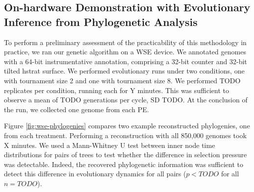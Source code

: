 
\subsection{On-hardware Demonstration with Evolutionary Inference from Phylogenetic Analysis}



To perform a preliminary assessment of the practicability of this methodology in practice, we ran our genetic algorithm on a WSE device.
We annotated genomes with a 64-bit instrumentative annotation, comprising a 32-bit counter and 32-bit tilted hstrat surface.
We performed evolutionary runs under two conditions, one with tournament size 2 and one with tournament size 8.
We performed TODO replicates per condition, running each for Y minutes.
This was sufficient to observe a mean of TODO generations per cycle, SD TODO.
At the conclusion of the run, we collected one genome from each PE.

Figure \ref{fig:wse-phylogenies} compares two example reconstructed phylogenies, one from each treatment.
Performing a reconstruction with all 850,000 genomes took X minutes.
We used a Mann-Whitney U test between inner node time distributions for pairs of trees to test whether the difference in selection pressure was detectable.
Indeed, the recovered phylogenetic information was sufficient to detect this difference in evolutionary dynamics for all pairs ($p < TODO$ for all $n=TODO$).
